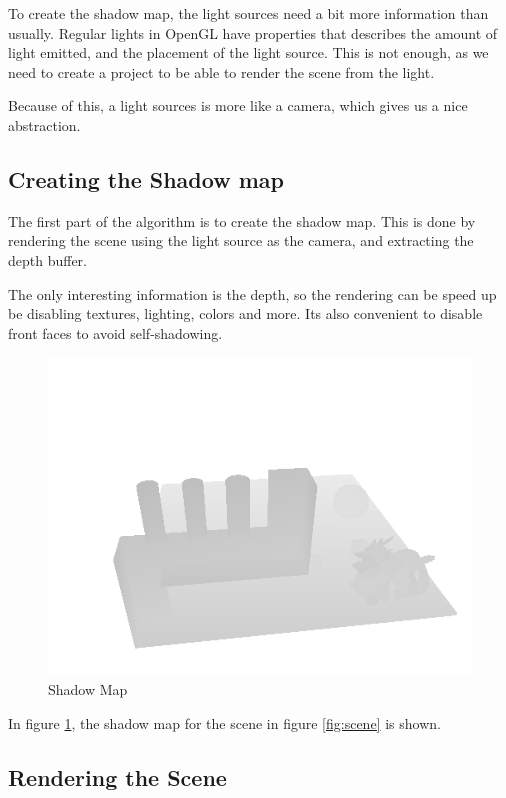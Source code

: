To create the shadow map, the light sources need a bit more
information than usually. Regular lights in OpenGL have properties
that describes the amount of light emitted, and the placement of the
light source. This is not enough, as we need to create a project to be
able to render the scene from the light. 

Because of this, a light sources is more like a camera, which gives us
a nice abstraction. 


\subsection{Creating the Shadow map}

The first part of the algorithm is to create the shadow map. This is
done by rendering the scene using the light source as the camera, and
extracting the depth buffer.

 The only interesting information is
the depth, so the rendering can be speed up be disabling textures,
lighting, colors and more. Its also convenient to disable front faces
to avoid self-shadowing. %

\begin{figure}[h]
  \centering
  \includegraphics[width=\textwidth]{gfx/shadowmap}  
  \caption{Shadow Map}
  \label{fig:shadowmap}
\end{figure}

In figure \ref{fig:shadowmap}, the shadow map for the scene in figure
\ref{fig:scene} is shown.

\subsection{Rendering the Scene}


